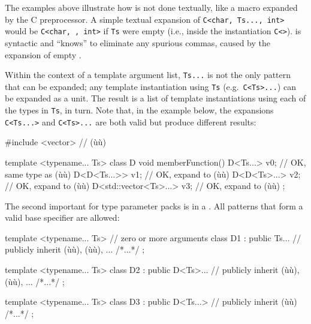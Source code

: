 \noindent The examples above illustrate how  is not done
textually, like a macro expanded by the C preprocessor. A simple textual
expansion of \lstinline!C<char,!~\lstinline!Ts...,!~\lstinline!int>! would be
\lstinline!C<char,!~\lstinline!,!~\lstinline!int>! if \lstinline!Ts! were empty
(i.e., inside the instantiation \lstinline!C<>!).  is syntactic and ``knows'' to eliminate any spurious commas,
caused by the expansion of empty .

Within the context of a template argument list, \lstinline!Ts...! is not
the only pattern that can be expanded; any template instantiation using
\lstinline!Ts! (e.g.~\lstinline!C<Ts>...!) can be expanded as a unit. The
result is a list of template instantiations using each of the types in
\lstinline!Ts!, in turn. Note that, in the example below, the expansions
\lstinline!C<Ts...>! and \lstinline!C<Ts>...! are both valid but produce
different results:

\begin{emcppslisting}[emcppsbatch=e9]
#include <vector>  // (ù{}ù)

template <typename... Ts> class D
{
    void memberFunction()
    {
        D<Ts...> v0;               // OK, same type as (ù{}ù)
        D<D<Ts...>> v1;            // OK, expand to (ù{}ù)
        D<D<Ts>...>  v2;           // OK, expand to (ù{}ù)
        D<std::vector<Ts>...> v3;  // OK, expand to (ù{}ù)
    }
};
\end{emcppslisting}
    

\noindent The second important  for type
parameter packs is in a . All patterns that
form a valid base specifier are allowed:

\begin{emcppslisting}[emcppsbatch=e9]
template <typename... Ts>   // zero or more arguments
class D1 : public Ts...     // publicly inherit (ù{}ù), (ù{}ù), ...
{ /*...*/ };

template <typename... Ts>
class D2 : public D<Ts>...  // publicly inherit (ù{}ù), (ù{}ù), ...
{ /*...*/ };

template <typename... Ts>
class D3 : public D<Ts...>  // publicly inherit (ù{}ù)
{ /*...*/ };
\end{emcppslisting}
    

